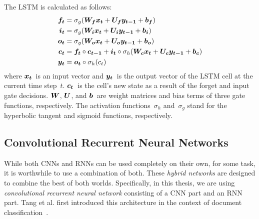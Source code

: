 The LSTM is calculated as follows:
$$
  \begin{aligned}
\boldsymbol{f_t} &= \sigma_g(\boldsymbol{W_{f}} \boldsymbol{x_t} + \boldsymbol{U_{f}} \boldsymbol{y_{t-1}} + \boldsymbol{b_f}) \\
\boldsymbol{i_t} &= \sigma_g(\boldsymbol{W_{i}} \boldsymbol{x_t} + \boldsymbol{U_{i}} \boldsymbol{y_{t-1}} + \boldsymbol{b_i}) \\
\boldsymbol{o_t} &= \sigma_g(\boldsymbol{W_{o}} \boldsymbol{x_t} + \boldsymbol{U_{o}} \boldsymbol{y_{t-1}} + \boldsymbol{b_o}) \\
\boldsymbol{c_t} &= \boldsymbol{f_t} \circ \boldsymbol{c_{t-1}} + \boldsymbol{i_t} \circ \sigma_h(\boldsymbol{W_{c}} \boldsymbol{x_t} + \boldsymbol{U_{c}} \boldsymbol{y_{t-1}} + \boldsymbol{b_c}) \\
\boldsymbol{y_t} &= \boldsymbol{o_t} \circ \sigma_h(c_t)
  \end{aligned}
$$
where $\boldsymbol{x_t}$~is an input vector and $\boldsymbol{y_t}$~is the output vector of the LSTM cell at the current time step~$t$. $\boldsymbol{c_t}$~is the cell's new state as a result of the forget and input gate decisions. $\boldsymbol{W}$, $\boldsymbol{U}$, and $\boldsymbol{b}$~are weight matrices and bias terms of three gate functions, respectively. The activation functions~$\sigma_h$ and~$\sigma_g$ stand for the hyperbolic tangent and sigmoid functions, respectively.


\subsection{Convolutional Recurrent Neural Networks}
\label{sec:hybrid_networks}
While both CNNs and RNNs can be used completely on their own, for some task, it is worthwhile to use a combination of both. These \emph{hybrid networks} are designed to combine the best of both worlds. Specifically, in this thesis, we are using \emph{convolutional recurrent neural network} consisting of a CNN part and an RNN part. Tang et al. first introduced this architecture in the context of document classification~\cite{tang2015document}.

